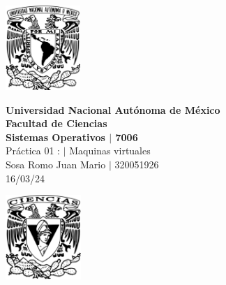 \begin{center}
    \begin{minipage}{3cm}
    	\begin{center}
    		\includegraphics[height=3.2cm]{src/Img/Logo_UNAM.png}
    	\end{center}
    \end{minipage}\hfill
    \begin{minipage}{10cm}
    	\begin{center}
    	\textbf{\large Universidad Nacional Autónoma de México}\\[0.1cm]
        \textbf{Facultad de Ciencias}\\[0.1cm]
        \textbf{Sistemas Operativos  $|$ 7006}\\[0.1cm]
        Práctica 01 : $|$ Maquinas virtuales \\[0.1cm]
        Sosa Romo Juan Mario $|$ 320051926 \\[0.1cm]
        16/03/24
    	\end{center}
    \end{minipage}\hfill
    \begin{minipage}{3cm}
    	\begin{center}
    		\includegraphics[height=3.2cm]{src/Img/Logo_FC.png}
    	\end{center}
    \end{minipage}
\end{center}

